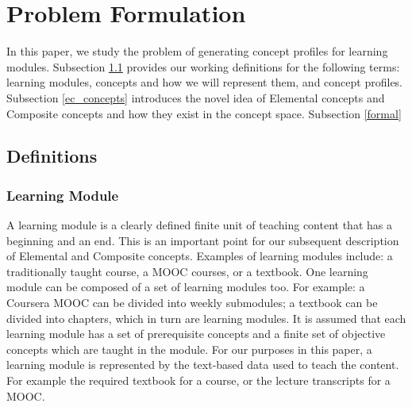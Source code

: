 \section{Problem Formulation}



In this paper, we study the problem of generating concept profiles for learning modules. Subsection \ref{definitions} provides our working definitions for the following terms: learning modules, concepts and how we will represent them, and concept profiles. Subsection \ref{ec_concepts} introduces the novel idea of Elemental concepts and Composite concepts and how they exist in the concept space. Subsection \ref{formal}

\subsection{Definitions}\label{definitions}
\subsubsection{Learning Module}\label{learning_module}
A learning module is a clearly defined finite unit of teaching content that has a beginning and an end. This is an important point for our subsequent description of Elemental and Composite concepts. Examples of learning modules include: a traditionally taught course, a MOOC courses, or a textbook. One learning module can be composed of a set of learning modules too. For example: a Coursera MOOC can be divided into weekly submodules; a textbook can be divided into chapters, which in turn are learning modules.
It is assumed that each learning module has a set of prerequisite concepts and a finite set of objective concepts which are taught in the module.
For our purposes in this paper, a learning module is represented by the text-based data used to teach the content. For example the required textbook for a course, or the lecture transcripts for a MOOC.

